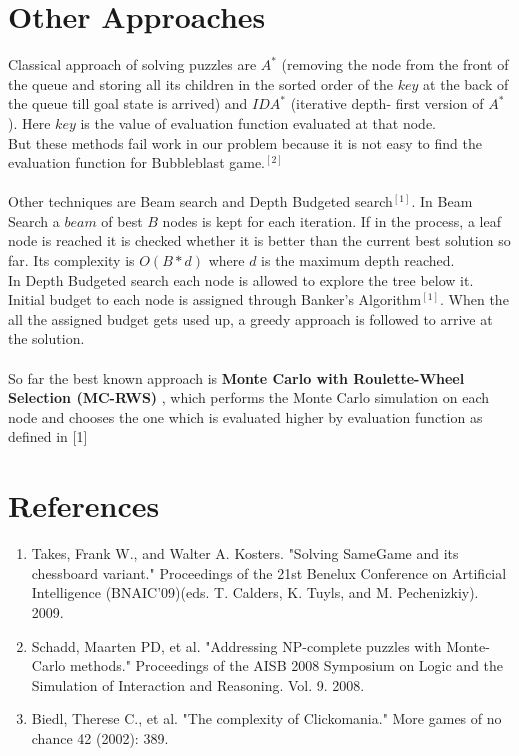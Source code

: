 \documentclass[twoside]{article}
\begin{document}
\begin{multicols}{2}
\section{Other Approaches}
Classical approach of solving puzzles are $A^{*}$ (removing the node from the front of the queue and storing all its children in the sorted order of the $key$ at the back of the queue till goal state is arrived) and $IDA^{*}$ (iterative depth- first version of $A^{*}$). Here $key$ is the value of evaluation function evaluated at that node.\\
But these methods fail work in our problem because it is not easy to find the evaluation function for Bubbleblast game.$^{[2]}$\\\\
Other techniques are Beam search and Depth Budgeted search$^{[1]}$. In Beam Search a $beam$ of best $B$ nodes is kept for each iteration. If in the process, a leaf node is reached it is checked whether it is better than the current best solution so far. Its complexity is $O(B*d)$ where $d$ is the maximum depth reached.\\
In Depth Budgeted search each node is allowed to explore the tree below it. Initial budget to each node is assigned through Banker's Algorithm$^{[1]}$. When the all the assigned budget gets used up, a greedy approach is followed to arrive at the solution.\\\\
So far the best known approach is \textbf{Monte Carlo with Roulette-Wheel Selection (MC-RWS)
}, which performs the Monte Carlo simulation on each node and chooses the one which is evaluated higher by evaluation function as defined in [1]
\section{References}
\begin{enumerate}
\item Takes, Frank W., and Walter A. Kosters. "Solving SameGame and its chessboard variant." Proceedings of the 21st Benelux Conference on Artificial Intelligence (BNAIC’09)(eds. T. Calders, K. Tuyls, and M. Pechenizkiy). 2009.
\item Schadd, Maarten PD, et al. "Addressing NP-complete puzzles with Monte-Carlo methods." Proceedings of the AISB 2008 Symposium on Logic and the Simulation of Interaction and Reasoning. Vol. 9. 2008.
\item Biedl, Therese C., et al. "The complexity of Clickomania." More games of no chance 42 (2002): 389.
\end{enumerate}

\end{multicols}
\end{document}
